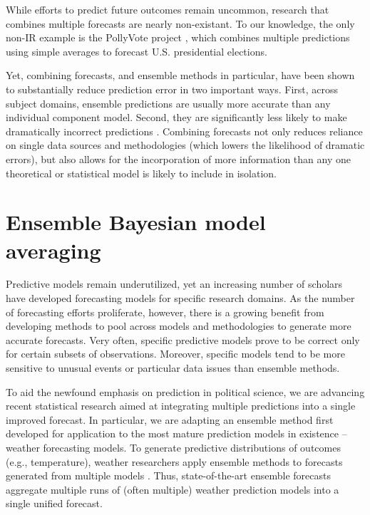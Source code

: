 \documentclass[12pt,fullpage]{article}
\begin{document}
While efforts to predict future outcomes remain uncommon, research
that combines multiple forecasts are nearly non-existant.  To our
knowledge, the only non-IR example is the PollyVote project
\citep[c.f.][]{Graefe:2010}, which combines multiple predictions using
simple averages to forecast U.S. presidential elections.

Yet, combining forecasts, and ensemble methods in particular, have
been shown to substantially reduce prediction error in two important
ways.  First, across subject domains, ensemble predictions are usually
more accurate than any individual component model. Second, they are
significantly less likely to make dramatically incorrect predictions
\citep{Bates:1969, Armstrong:2001, Raftery:2005}.  Combining forecasts
not only reduces reliance on single data sources and methodologies
(which lowers the likelihood of dramatic errors), but also allows for
the incorporation of more information than any one theoretical or
statistical model is likely to include in isolation. 

\section{Ensemble Bayesian model averaging} 

Predictive models remain underutilized, yet an increasing number of
scholars have developed forecasting models for specific research
domains.  As the number of forecasting efforts proliferate, however,
there is a growing benefit from developing methods to pool across
models and methodologies to generate more accurate forecasts.  Very
often, specific predictive models prove to be correct only for certain
subsets of observations.  Moreover, specific models tend to be more
sensitive to unusual events or particular data issues than ensemble
methods.

To aid the newfound emphasis on prediction in political science, we
are advancing recent statistical research aimed at integrating
multiple predictions into a single improved forecast.  In particular,
we are adapting an ensemble method first developed for application to
the most mature prediction models in existence -- weather forecasting
models.  To generate predictive distributions of outcomes (e.g.,
temperature), weather researchers apply ensemble methods to forecasts
generated from multiple models \citep{Raftery:2005}.  Thus,
state-of-the-art ensemble forecasts aggregate multiple runs of (often
multiple) weather prediction models into a single unified forecast.
\end{document}
